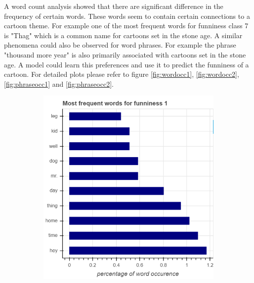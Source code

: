 \documentclass[draft,final,oneside]{vutinfth} %
\begin{document}
A word count analysis showed that there are significant difference in the frequency of certain words. These words seem to contain certain connections to a cartoon theme. For example one of the most frequent words for funniness class 7 is "Thag" which is a common name for cartoons set in the stone age. A similar phenomena could also be observed for word phrases. For example the phrase "thousand more year" is also primarily associated with cartoons set in the stone age. A model could learn this preferences and use it to predict the funniness of a cartoon. For detailed plots please refer to figure \ref{fig:wordocc1}, \ref{fig:wordocc2}, \ref{fig:phraseocc1} and \ref{fig:phraseocc2}.

\begin{figure}
\centering

\begin{subfigure}[b]{0.45\textwidth}
\centering
\includegraphics[width=1.0\textwidth]{graphics/word_occurence/funniness_1}
\end{subfigure}\quad
\begin{subfigure}[b]{0.45\textwidth}
\centering

\end{subfigure}
\end{figure}
\end{document}
